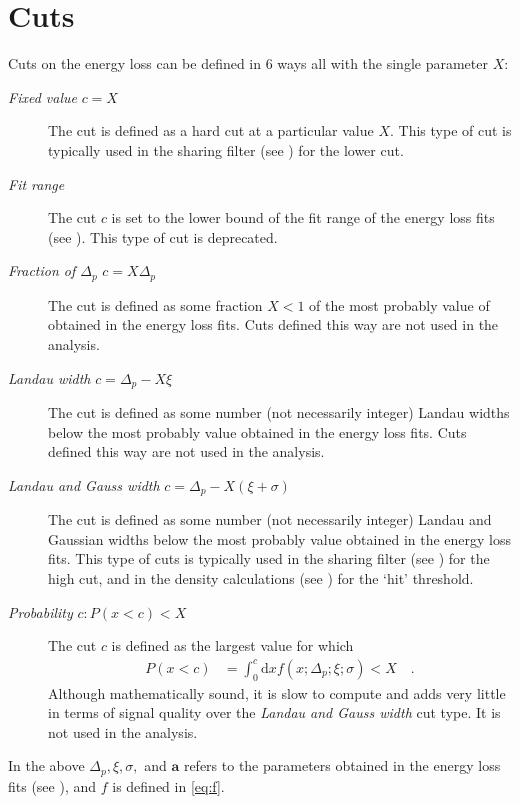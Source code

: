 \section{Cuts}
\label{sec:cuts}


Cuts on the energy loss can be defined in 6 ways all with the single
parameter $X$:
\begin{description}
\item[\emph{Fixed value} $c=X$]
  The cut is defined as a hard cut at a particular value $X$.  This
  type of cut is typically used in the sharing filter (see
  ) for the lower cut.
\item[\emph{Fit range}]
  The cut $c$ is set to the lower bound of the fit range of the energy
  loss fits (see ).  This type of cut is deprecated.
\item[\emph{Fraction of $\Delta_p$} $c=X\Delta_p$] The cut is defined
  as some fraction $X<1$ of the most probably value of obtained in
  the energy loss fits.  Cuts defined this way are not used in the
  analysis. 
\item[\emph{Landau width} $c=\Delta_p-X\xi$] The cut is defined as
  some number (not necessarily integer) Landau widths below the most
  probably value obtained in the energy loss fits. Cuts defined this
  way are not used in the analysis. 
\item[\emph{Landau and Gauss width} $c=\Delta_p - X(\xi+\sigma)$] The
  cut is defined as some number (not necessarily integer) Landau and
  Gaussian widths below the most probably value obtained in the energy
  loss fits. This type of cuts is typically used in the sharing filter
  (see ) for the high cut, and in the
  density calculations (see ) for
  the `hit' threshold.
\item[\emph{Probability} $c:P(x<c)<X$] The cut $c$ is defined as
  the largest value for which 
  \begin{align*}
    P(x<c) &= \int_0^c\text{d}x f(x;\Delta_p;\xi;\sigma) < X\quad.
  \end{align*}
  Although mathematically sound, it is slow to compute and adds very
  little in terms of signal quality over the \emph{Landau and Gauss
    width}  cut type.  It is not used in the analysis.
\end{description}
In the above $\Delta_p,\xi,\sigma,$ and $\mathbf{a}$ refers to the
parameters obtained in the energy loss fits (see ),
and $f$ is defined in \eqref{eq:f}.

